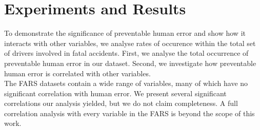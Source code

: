 \documentclass{article}
\theoremstyle{plain}
\theoremstyle{definition}
\theoremstyle{remark}
\begin{document}
\section{Experiments and Results}\label{sec:results}
To demonstrate the significance of preventable human error and show how it interacts with other variables, we analyse rates of occurence within the total set of drivers involved in fatal accidents. First, we analyse the total occurrence of preventable human error in our dataset. Second, we investigate how preventable human error is correlated with other variables.
\\
The FARS datasets contain a wide range of variables, many of which have no significant correlation with human error. We present several significant correlations our analysis yielded, but we do not claim completeness. A full correlation analysis with every variable in the FARS is beyond the scope of this work.
\end{document}
